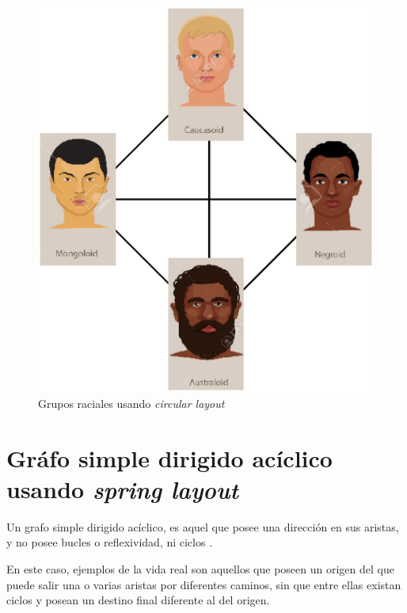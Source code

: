 \documentclass{article}
\begin{document}
\begin{figure}[h]
    \centering
    \includegraphics[scale=0.4]{imagenes1/Fig03.eps}
    \caption{Grupos raciales usando \textit{circular layout}}
    \label{fig:Fig03}
\end{figure}

\section{Gráfo simple dirigido acíclico usando \textit{spring layout}}

Un grafo simple dirigido acíclico, es aquel que posee una dirección en sus aristas, y no posee bucles o reflexividad, ni ciclos \cite{Elisa}.
 
En este caso, ejemplos de la vida real son aquellos que poseen un origen del que puede salir una o varias aristas por diferentes caminos, sin que entre ellas existan ciclos y posean un destino final diferente al del origen. 
\end{document}
